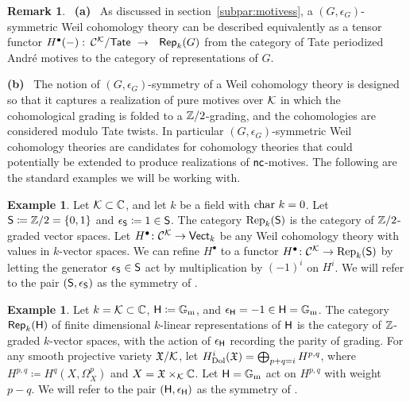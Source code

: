 \documentclass[twoside,leqno]{article}
\numberwithin{equation}{section}
\theoremstyle{plain}
\theoremstyle{definition}
\newtheorem{example}[equation]{Example}
\newtheorem{remark}[equation]{Remark}
\begin{document}
\begin{remark} \label{rem:symmetryG}
\ {\bfseries (a)} \ As discussed in section~\ref{subpar:motivess}, a $(G,\epsilon_{G})$-symmetric Weil cohomology theory can be described equivalently as  a tensor functor $H^{\bullet}(-) \, \colon \, \mathcal{C}^{\mathcal K}/\mathsf{Tate} \ \to \ \ \mathsf{Rep}_{k}(G)$ from the category of Tate periodized Andr\'{e} motives to the category of representations of $G$.

{\bfseries (b)} \ 
The notion of $(G,\epsilon_{G})$-symmetry of a Weil cohomology theory is designed so that it captures a realization of pure motives over $\mathcal K$ in which the cohomological grading is folded to a $\bbZ/2$-grading, and the cohomologies are considered modulo Tate twists. In particular $(G,\epsilon_{G})$-symmetric Weil cohomology theories are candidates for cohomology theories that could potentially be extended to produce realizations of $\textsf{nc}$-motives. The following are the standard examples we will be working with.
\end{remark}

\begin{example} \label{ex:Z/2graded}
    Let $\mathcal K \subset \mathbb C$, and let $k$ be a field with $\operatorname{char}\, k = 0$. Let 
    $\mathsf{S} \coloneqq \mathbb Z/2 = \{0,1\}$ and $\epsilon_{\mathsf{S}} \coloneqq 1 \in \mathsf{S}$. The category $\operatorname{Rep}_{k}(\mathsf{S})$ is the category of $\bbZ/2$-graded vector spaces. Let $H^{\bullet} \colon \mathcal{C}^{\mathcal K} \to \mathsf{Vect}_{k}$ be any Weil cohomology theory with values in $k$-vector spaces. We can refine $H^{\bullet}$ to a functor 
    $H^{\bullet} \colon \mathcal{C}^{\mathcal K} \to  \operatorname{Rep}_{k}(\mathsf{S})$ by letting the generator $\epsilon_{\mathsf{S}} \in \mathsf{S}$ act by multiplication by $(-1)^i$ on $H^{i}$. We will refer to the pair $\left(\mathsf{S},\epsilon_{\mathsf{S}}\right)$ as the symmetry of \strongemph{$\bbZ/2$-graded Weil cohomology theories}.
\end{example}

\begin{example} \label{ex:Hochschildgraded}
    Let $k = \mathcal K \subset \mathbb C$, $\mathsf{H} \coloneqq \mathbb G_\mathrm{m}$, and $\epsilon_{\mathsf{H}} = -1 \in \mathsf{H} = \mathbb G_\mathrm{m}$. The category $\mathsf{Rep}_{k}(\mathsf{H})$ of  finite dimensional $k$-linear representations of $\mathsf{H}$ is the category of $\mathbb Z$-graded $k$-vector spaces, with the action of $\epsilon_{\mathsf{H}}$ recording the parity of grading. 
    For any smooth projective variety $\mathfrak{X}/\mathcal K$, let $H^i_{\operatorname{Dol}}(\mathfrak{X}) = \bigoplus_{p+q=i} H^{p,q}$, where $H^{p,q} \coloneqq H^q(X, \Omega^p_{X})$ and $X = \mathfrak{X} \times_{\mathcal K} \mathbb C$. Let $\mathsf{H} = \mathbb G_\mathrm{m}$ act on $H^{p,q}$ with weight $p-q$. We will refer to the pair $\left(\mathsf{H},\epsilon_{\mathsf{H}}\right)$ as the symmetry of .
\end{example}
\end{document}
